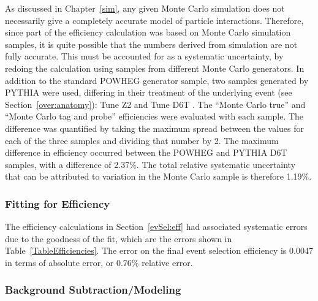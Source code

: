 As discussed in Chapter~\ref{sim}, 
any given Monte Carlo simulation 
does not necessarily give a completely accurate 
model of particle interactions.  %
Therefore, since part of the efficiency calculation 
was based on Monte Carlo simulation samples, 
it is quite possible that the numbers 
derived from simulation are not fully 
accurate.  
This must be accounted for as a systematic 
uncertainty, %
by redoing the calculation using samples 
from different Monte Carlo generators.  
In addition to the standard POWHEG generator 
sample, 
two samples generated by PYTHIA were used, 
differing in their treatment of the underlying event
(see Section~\ref{over:anatomy}): 
Tune Z2 \cite{TuneZ2} 
and Tune D6T \cite{TuneD6T}.  
The ``Monte Carlo true'' and ``Monte Carlo tag and probe'' 
efficiencies were evaluated with each sample.  
The difference was quantified by taking the 
maximum spread between the values for each of the 
three samples 
and dividing that number by 2.  
The maximum difference in efficiency occurred 
between the POWHEG and PYTHIA D6T samples, 
with a difference of 2.37\%.  
The total relative systematic uncertainty that can be 
attributed to variation in the Monte Carlo 
sample is therefore 1.19\%.  



\subsubsection{Fitting for Efficiency}
\label{anMeth:SystsOtherFitEff}


The efficiency calculations in Section~\ref{evSel:eff} 
had associated systematic errors due to the 
goodness of the fit, 
which are the errors shown in Table~\ref{TableEfficiencies}.  
The error on the final event selection 
efficiency is 0.0047 in terms of absolute error, 
or 0.76\% relative error.  


\subsubsection{Background Subtraction/Modeling}
\label{anMeth:SystsOtherBGSub}

